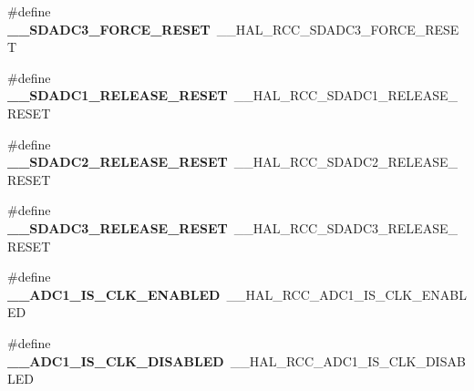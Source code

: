 \begin{DoxyCompactItemize}
\item 
\#define {\bfseries \+\_\+\+\_\+\+S\+D\+A\+D\+C3\+\_\+\+F\+O\+R\+C\+E\+\_\+\+R\+E\+S\+ET}~\+\_\+\+\_\+\+H\+A\+L\+\_\+\+R\+C\+C\+\_\+\+S\+D\+A\+D\+C3\+\_\+\+F\+O\+R\+C\+E\+\_\+\+R\+E\+S\+ET\hypertarget{group___h_a_l___r_c_c___aliased_ga6a3f02c81f3fbd193d9d06e429824c68}{}\label{group___h_a_l___r_c_c___aliased_ga6a3f02c81f3fbd193d9d06e429824c68}

\item 
\#define {\bfseries \+\_\+\+\_\+\+S\+D\+A\+D\+C1\+\_\+\+R\+E\+L\+E\+A\+S\+E\+\_\+\+R\+E\+S\+ET}~\+\_\+\+\_\+\+H\+A\+L\+\_\+\+R\+C\+C\+\_\+\+S\+D\+A\+D\+C1\+\_\+\+R\+E\+L\+E\+A\+S\+E\+\_\+\+R\+E\+S\+ET\hypertarget{group___h_a_l___r_c_c___aliased_ga4c37af0e1de4a052f0a5a66a13369f49}{}\label{group___h_a_l___r_c_c___aliased_ga4c37af0e1de4a052f0a5a66a13369f49}

\item 
\#define {\bfseries \+\_\+\+\_\+\+S\+D\+A\+D\+C2\+\_\+\+R\+E\+L\+E\+A\+S\+E\+\_\+\+R\+E\+S\+ET}~\+\_\+\+\_\+\+H\+A\+L\+\_\+\+R\+C\+C\+\_\+\+S\+D\+A\+D\+C2\+\_\+\+R\+E\+L\+E\+A\+S\+E\+\_\+\+R\+E\+S\+ET\hypertarget{group___h_a_l___r_c_c___aliased_ga2e4a60fcdf3be6c4ce6414cd859b245c}{}\label{group___h_a_l___r_c_c___aliased_ga2e4a60fcdf3be6c4ce6414cd859b245c}

\item 
\#define {\bfseries \+\_\+\+\_\+\+S\+D\+A\+D\+C3\+\_\+\+R\+E\+L\+E\+A\+S\+E\+\_\+\+R\+E\+S\+ET}~\+\_\+\+\_\+\+H\+A\+L\+\_\+\+R\+C\+C\+\_\+\+S\+D\+A\+D\+C3\+\_\+\+R\+E\+L\+E\+A\+S\+E\+\_\+\+R\+E\+S\+ET\hypertarget{group___h_a_l___r_c_c___aliased_gaeea6e6ea584aed7317914020ccd3e071}{}\label{group___h_a_l___r_c_c___aliased_gaeea6e6ea584aed7317914020ccd3e071}

\item 
\#define {\bfseries \+\_\+\+\_\+\+A\+D\+C1\+\_\+\+I\+S\+\_\+\+C\+L\+K\+\_\+\+E\+N\+A\+B\+L\+ED}~\+\_\+\+\_\+\+H\+A\+L\+\_\+\+R\+C\+C\+\_\+\+A\+D\+C1\+\_\+\+I\+S\+\_\+\+C\+L\+K\+\_\+\+E\+N\+A\+B\+L\+ED\hypertarget{group___h_a_l___r_c_c___aliased_ga9c6a5800240c7a38160f7b55d993d014}{}\label{group___h_a_l___r_c_c___aliased_ga9c6a5800240c7a38160f7b55d993d014}

\item 
\#define {\bfseries \+\_\+\+\_\+\+A\+D\+C1\+\_\+\+I\+S\+\_\+\+C\+L\+K\+\_\+\+D\+I\+S\+A\+B\+L\+ED}~\+\_\+\+\_\+\+H\+A\+L\+\_\+\+R\+C\+C\+\_\+\+A\+D\+C1\+\_\+\+I\+S\+\_\+\+C\+L\+K\+\_\+\+D\+I\+S\+A\+B\+L\+ED\hypertarget{group___h_a_l___r_c_c___aliased_ga72176a626f4a7bafd415028cc446093e}{}\label{group___h_a_l___r_c_c___aliased_ga72176a626f4a7bafd415028cc446093e}


\end{DoxyCompactItemize}
